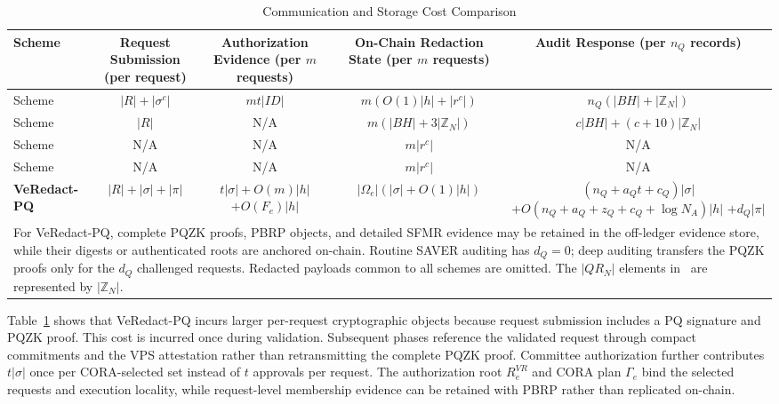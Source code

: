 \documentclass[lettersize,journal]{IEEEtran}
\begin{document}
\begin{table}[t]
\centering
\caption{Communication and Storage Cost Comparison}
\label{tab:comm-cost}
\footnotesize
\renewcommand{\arraystretch}{1.25}
\setlength{\tabcolsep}{3.8pt}
\begin{tabular}{lcccc}
\toprule
\textbf{Scheme} &
\makecell{\textbf{Request Submission}\\\textbf{(per request)}} &
\makecell{\textbf{Authorization Evidence}\\\textbf{(per $m$ requests)}} &
\makecell{\textbf{On-Chain Redaction State}\\\textbf{(per $m$ requests)}} &
\makecell{\textbf{Audit Response}\\\textbf{(per $n_Q$ records)}} \\
\midrule

Scheme~\cite{ref1}
& $|R|+|\sigma^{c}|$
& $mt|ID|$
& $m(O(1)|h|+|r^{c}|)$
& $n_Q(|BH|+|\mathbb{Z}_N|)$ \\

Scheme~\cite{ref13}
& $|R|$
& N/A
& $m(|BH|+3|\mathbb{Z}_N|)$
& $c|BH|+(c+10)|\mathbb{Z}_N|$ \\

Scheme~\cite{ref27}
& N/A
& N/A
& $m|r^{c}|$
& N/A \\

Scheme~\cite{ref34}
& N/A
& N/A
& $m|r^{c}|$
& N/A \\

\midrule
\textbf{VeRedact-PQ}
& $|R|+|\sigma|+|\pi|$
& \makecell{$t|\sigma|+O(m)|h|$\\
$+O(F_e)|h|$}
& $|\Omega_e|(|\sigma|+O(1)|h|)$
& \makecell{$(n_Q+a_Qt+c_Q)|\sigma|$\\
$+O(n_Q+a_Q+z_Q+c_Q+\log N_A)|h|$\\
$+d_Q|\pi|$} \\

\bottomrule
\multicolumn{5}{p{0.96\textwidth}}{\footnotesize
For VeRedact-PQ, complete PQZK proofs, PBRP objects, and detailed SFMR
evidence may be retained in the off-ledger evidence store, while their
digests or authenticated roots are anchored on-chain. Routine SAVER
auditing has $d_Q=0$; deep auditing transfers the PQZK proofs only for
the $d_Q$ challenged requests. Redacted payloads common to all schemes
are omitted. The $|QR_N|$ elements in~\cite{ref13} are represented by
$|\mathbb{Z}_N|$.}
\end{tabular}
\end{table}

Table~\ref{tab:comm-cost} shows that VeRedact-PQ incurs larger
per-request cryptographic objects because request submission includes a
PQ signature and PQZK proof. This cost is incurred once during
validation. Subsequent phases reference the validated request through
compact commitments and the VPS attestation rather than retransmitting
the complete PQZK proof. Committee authorization further contributes
$t|\sigma|$ once per CORA-selected set instead of $t$ approvals per
request. The authorization root $R_e^{VR}$ and CORA plan $\Gamma_e$
bind the selected requests and execution locality, while request-level
membership evidence can be retained with PBRP rather than replicated
on-chain.
\end{document}

